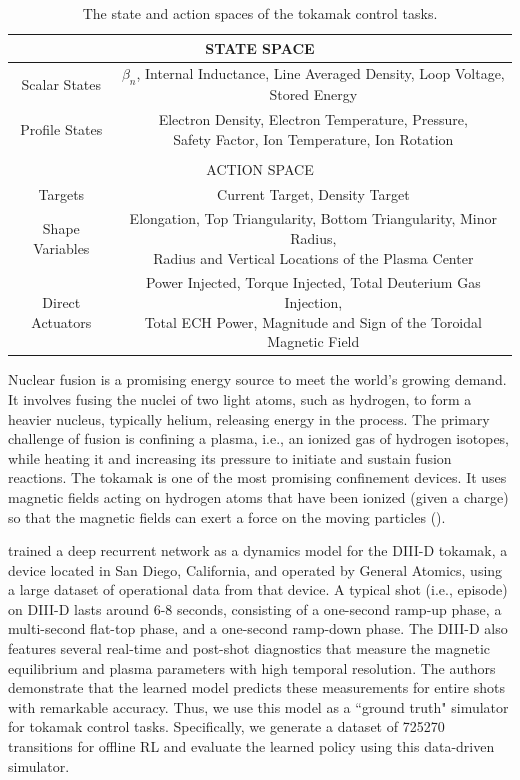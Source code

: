 \begin{table}[htbp]
\small
\centering
\begin{tabular}{|c||c|}
\hline
\multicolumn{2}{|c|}{STATE SPACE} \\
\hline
{Scalar States} & \makecell{$\beta_n$, Internal Inductance, Line Averaged Density,\\ Loop Voltage, Stored Energy} \\
\hline
{Profile States} & \makecell{Electron Density, Electron Temperature, Pressure,\\ Safety Factor, Ion Temperature, Ion Rotation} \\
\hline
\multicolumn{2}{c}{}\\[-0.5em]
\hline
\multicolumn{2}{|c|}{ACTION SPACE} \\
\hline
{Targets} & {Current Target, Density Target} \\
\hline
{Shape Variables} & \makecell{Elongation, Top Triangularity, Bottom Triangularity, Minor Radius, \\Radius and Vertical Locations of the Plasma Center} \\
\hline
{Direct Actuators} & \makecell{Power Injected, Torque Injected, Total Deuterium Gas Injection,\\ Total ECH Power, Magnitude and Sign of the Toroidal Magnetic Field} \\
\hline
\end{tabular}
\caption{The state and action spaces of the tokamak control tasks.}
\label{table:7}
\end{table}

Nuclear fusion is a promising energy source to meet the world’s growing demand. It involves fusing the nuclei of two light atoms, such as hydrogen, to form a heavier nucleus, typically helium, releasing energy in the process. The primary challenge of fusion is confining a plasma, i.e., an ionized gas of hydrogen isotopes, while heating it and increasing its pressure to initiate and sustain fusion reactions. The tokamak is one of the most promising confinement devices. It uses magnetic fields acting on hydrogen atoms that have been ionized (given a charge) so that the magnetic fields can exert a force on the moving particles (\cite{1512794}). 

\cite{DBLP:journals/corr/abs-2404-12416} trained a deep recurrent network as a dynamics model for the DIII-D tokamak, a device located in San Diego, California, and operated by General Atomics, using a large dataset of operational data from that device. A typical shot (i.e., episode) on DIII-D lasts around 6-8 seconds, consisting of a one-second ramp-up phase, a multi-second flat-top phase, and a one-second ramp-down phase. The DIII-D also features several real-time and post-shot diagnostics that measure the magnetic equilibrium and plasma parameters with high temporal resolution. The authors demonstrate that the learned model predicts these measurements for entire shots with remarkable accuracy. Thus, we use this model as a ``ground truth" simulator for tokamak control tasks. Specifically, we generate a dataset of 725270 transitions for offline RL and evaluate the learned policy using this data-driven simulator.

